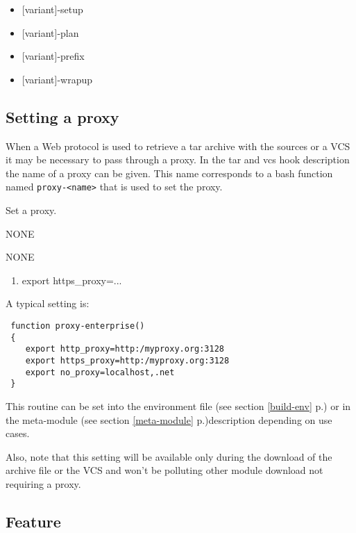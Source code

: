 \documentclass[a4paper,12pt,twoside]{article}
\newcommand{\code}[1]{\texttt{#1}}
\newcommand{\seeref}[1]{see section \ref{#1} p.\pageref{#1}}
\begin{document}
\begin{itemize}[font=\texttt]
	\item {[variant]-setup}
	\item {[variant]-plan}
	\item {[variant]-prefix}
	\item {[variant]-wrapup}
\end{itemize}

\subsection{Setting a proxy}
\label{proxy}

When a Web protocol is used to retrieve a tar archive with the sources or a VCS it may be necessary to pass through a proxy. In the tar and vcs hook description the name of a proxy can be given. This name corresponds to a bash function named \code{proxy-<name>} that is used to set the proxy.

\begin{description}[style=nextline]
	\item[proxy-<name>] Set a proxy.
	\begin{description}[font=\textit,style=standard]
		\item[parameter] \tabto{2cm} NONE
		\item[return] \tabto{2cm} NONE
		\begin{enumerate}
			\item export https\_proxy=...
		\end{enumerate}
	\end{description}
\end{description}

A typical setting is:

\begin{lstlisting}
 function proxy-enterprise()
 {
    export http_proxy=http:/myproxy.org:3128
    export https_proxy=http:/myproxy.org:3128
    export no_proxy=localhost,.net
 }
\end{lstlisting}

This routine can be set into the environment file (\seeref{build-env}) or in the meta-module (\seeref{meta-module})description depending on use cases.

Also, note that this setting will be available only during the download of the archive file or the VCS and won't be polluting other module download not requiring a proxy.

\subsection{Feature}
\label{enable-feature}
\end{document}

